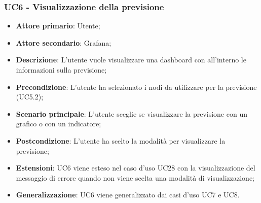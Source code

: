 \subsubsection{UC6 - Visualizzazione della previsione}
\label{sssec:uc6}
\begin{itemize}
  \item \textbf{Attore primario}: Utente;
  \item \textbf{Attore secondario}: Grafana;
  \item \textbf{Descrizione}: L'utente vuole visualizzare una dashboard con all'interno le informazioni sulla previsione;
  \item \textbf{Precondizione}: L'utente ha selezionato i nodi da utilizzare per la previsione (UC5.2);
  \item \textbf{Scenario principale}: L'utente sceglie se visualizzare la previsione con un grafico o con un indicatore;
  \item \textbf{Postcondizione}: L'utente ha scelto la modalità per visualizzare la previsione;
  \item \textbf{Estensioni}: UC6 viene esteso nel caso d'uso UC28 con la visualizzazione del messaggio di errore quando non viene scelta una modalità di visualizzazione;
  \item \textbf{Generalizzazione}: UC6 viene generalizzato dai casi d'uso UC7 e UC8.
\end{itemize}
